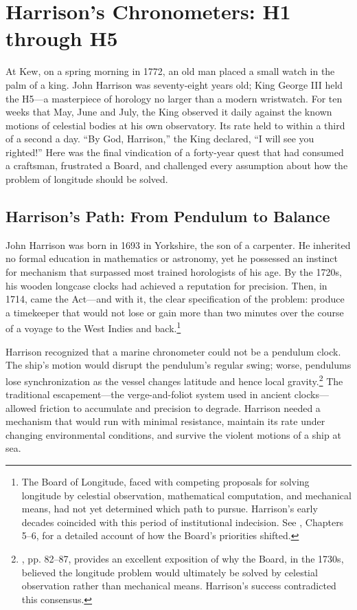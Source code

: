 \chapter{Harrison's Chronometers: H1 through H5}
\label{ch:harrison-chronometers}

At Kew, on a spring morning in 1772, an old man placed a small watch in the palm of a king. John Harrison was seventy-eight years old; King George III held the H5---a masterpiece of horology no larger than a modern wristwatch. For ten weeks that May, June and July, the King observed it daily against the known motions of celestial bodies at his own observatory. Its rate held to within a third of a second a day. ``By God, Harrison,'' the King declared, ``I will see you righted!'' Here was the final vindication of a forty-year quest that had consumed a craftsman, frustrated a Board, and challenged every assumption about how the problem of longitude should be solved.

\section{Harrison's Path: From Pendulum to Balance}

John Harrison was born in 1693 in Yorkshire, the son of a carpenter. He inherited no formal education in mathematics or astronomy, yet he possessed an instinct for mechanism that surpassed most trained horologists of his age. By the 1720s, his wooden longcase clocks had achieved a reputation for precision. Then, in 1714, came the Act—and with it, the clear specification of the problem: produce a timekeeper that would not lose or gain more than two minutes over the course of a voyage to the West Indies and back.\footnote{The Board of Longitude, faced with competing proposals for solving longitude by celestial observation, mathematical computation, and mechanical means, had not yet determined which path to pursue. Harrison's early decades coincided with this period of institutional indecision. See \textcite{Howse1980}, Chapters 5--6, for a detailed account of how the Board's priorities shifted.}

Harrison recognized that a marine chronometer could not be a pendulum clock. The ship's motion would disrupt the pendulum's regular swing; worse, pendulums lose synchronization as the vessel changes latitude and hence local gravity.\footnote{\textcite{Landes1983}, pp. 82--87, provides an excellent exposition of why the Board, in the 1730s, believed the longitude problem would ultimately be solved by celestial observation rather than mechanical means. Harrison's success contradicted this consensus.} The traditional escapement—the verge-and-foliot system used in ancient clocks—allowed friction to accumulate and precision to degrade. Harrison needed a mechanism that would run with minimal resistance, maintain its rate under changing environmental conditions, and survive the violent motions of a ship at sea.

